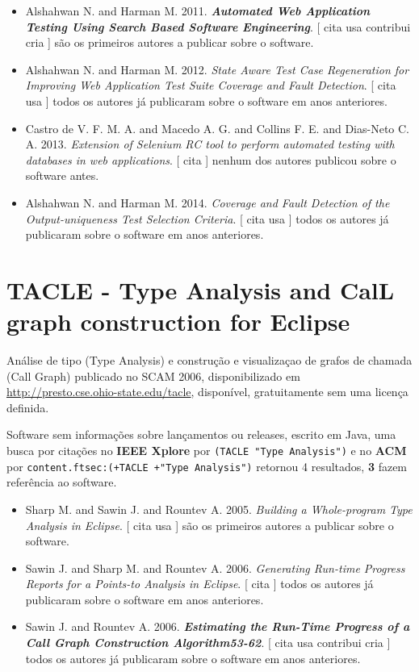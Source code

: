 \begin{itemize}
\item Alshahwan N. and Harman M.
      2011.
        \textbf{\textit{ Automated Web Application Testing Using Search Based Software Engineering}}.
      [
          cita
          usa
          contribui
          cria
      ]
são os primeiros autores a publicar sobre o software.
\item Alshahwan N. and Harman M.
      2012.
        \textit{ State Aware Test Case Regeneration for Improving Web Application Test Suite Coverage and Fault Detection}.
      [
          cita
          usa
      ]
todos os autores já publicaram sobre o software em anos anteriores.
\item Castro de V. F. M. A. and Macedo A. G. and Collins F. E. and Dias-Neto C. A.
      2013.
        \textit{ Extension of Selenium RC tool to perform automated testing with databases in web applications}.
      [
          cita
      ]
nenhum dos autores publicou sobre o software antes.
\item Alshahwan N. and Harman M.
      2014.
        \textit{ Coverage and Fault Detection of the Output-uniqueness Test Selection Criteria}.
      [
          cita
          usa
      ]
todos os autores já publicaram sobre o software em anos anteriores.
\end{itemize}
\section{TACLE - Type Analysis and CalL graph construction for Eclipse}

Análise de tipo (Type Analysis) e construção e visualizaçao de grafos de chamada (Call Graph)
publicado no SCAM 2006,
disponibilizado em \url{http://presto.cse.ohio-state.edu/tacle},
disponível,
gratuitamente
sem uma licença definida.

Software sem informações sobre lançamentos ou releases,
escrito em Java,
uma busca por citações no {\bf IEEE Xplore} por
\texttt{(TACLE "Type Analysis")}
e no {\bf ACM} por
\texttt{content.ftsec:(+TACLE +"Type Analysis")}
retornou
4 resultados,
{\bf 3} fazem referência ao software.

\begin{itemize}
\item Sharp M. and Sawin J. and Rountev A.
      2005.
        \textit{ Building a Whole-program Type Analysis in Eclipse}.
      [
          cita
          usa
      ]
são os primeiros autores a publicar sobre o software.
\item Sawin J. and Sharp M. and Rountev A.
      2006.
        \textit{ Generating Run-time Progress Reports for a Points-to Analysis in Eclipse}.
      [
          cita
      ]
todos os autores já publicaram sobre o software em anos anteriores.
\item Sawin J. and Rountev A.
      2006.
        \textbf{\textit{ Estimating the Run-Time Progress of a Call Graph Construction Algorithm53-62}}.
      [
          cita
          usa
          contribui
          cria
      ]
todos os autores já publicaram sobre o software em anos anteriores.
\end{itemize}
